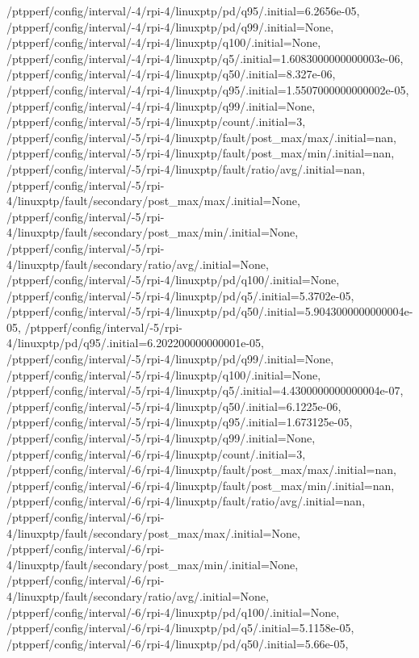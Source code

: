 {    /ptpperf/config/interval/-4/rpi-4/linuxptp/pd/q95/.initial=6.2656e-05,
    /ptpperf/config/interval/-4/rpi-4/linuxptp/pd/q99/.initial=None,
    /ptpperf/config/interval/-4/rpi-4/linuxptp/q100/.initial=None,
    /ptpperf/config/interval/-4/rpi-4/linuxptp/q5/.initial=1.6083000000000003e-06,
    /ptpperf/config/interval/-4/rpi-4/linuxptp/q50/.initial=8.327e-06,
    /ptpperf/config/interval/-4/rpi-4/linuxptp/q95/.initial=1.5507000000000002e-05,
    /ptpperf/config/interval/-4/rpi-4/linuxptp/q99/.initial=None,
    /ptpperf/config/interval/-5/rpi-4/linuxptp/count/.initial=3,
    /ptpperf/config/interval/-5/rpi-4/linuxptp/fault/post_max/max/.initial=nan,
    /ptpperf/config/interval/-5/rpi-4/linuxptp/fault/post_max/min/.initial=nan,
    /ptpperf/config/interval/-5/rpi-4/linuxptp/fault/ratio/avg/.initial=nan,
    /ptpperf/config/interval/-5/rpi-4/linuxptp/fault/secondary/post_max/max/.initial=None,
    /ptpperf/config/interval/-5/rpi-4/linuxptp/fault/secondary/post_max/min/.initial=None,
    /ptpperf/config/interval/-5/rpi-4/linuxptp/fault/secondary/ratio/avg/.initial=None,
    /ptpperf/config/interval/-5/rpi-4/linuxptp/pd/q100/.initial=None,
    /ptpperf/config/interval/-5/rpi-4/linuxptp/pd/q5/.initial=5.3702e-05,
    /ptpperf/config/interval/-5/rpi-4/linuxptp/pd/q50/.initial=5.9043000000000004e-05,
    /ptpperf/config/interval/-5/rpi-4/linuxptp/pd/q95/.initial=6.202200000000001e-05,
    /ptpperf/config/interval/-5/rpi-4/linuxptp/pd/q99/.initial=None,
    /ptpperf/config/interval/-5/rpi-4/linuxptp/q100/.initial=None,
    /ptpperf/config/interval/-5/rpi-4/linuxptp/q5/.initial=4.4300000000000004e-07,
    /ptpperf/config/interval/-5/rpi-4/linuxptp/q50/.initial=6.1225e-06,
    /ptpperf/config/interval/-5/rpi-4/linuxptp/q95/.initial=1.673125e-05,
    /ptpperf/config/interval/-5/rpi-4/linuxptp/q99/.initial=None,
    /ptpperf/config/interval/-6/rpi-4/linuxptp/count/.initial=3,
    /ptpperf/config/interval/-6/rpi-4/linuxptp/fault/post_max/max/.initial=nan,
    /ptpperf/config/interval/-6/rpi-4/linuxptp/fault/post_max/min/.initial=nan,
    /ptpperf/config/interval/-6/rpi-4/linuxptp/fault/ratio/avg/.initial=nan,
    /ptpperf/config/interval/-6/rpi-4/linuxptp/fault/secondary/post_max/max/.initial=None,
    /ptpperf/config/interval/-6/rpi-4/linuxptp/fault/secondary/post_max/min/.initial=None,
    /ptpperf/config/interval/-6/rpi-4/linuxptp/fault/secondary/ratio/avg/.initial=None,
    /ptpperf/config/interval/-6/rpi-4/linuxptp/pd/q100/.initial=None,
    /ptpperf/config/interval/-6/rpi-4/linuxptp/pd/q5/.initial=5.1158e-05,
    /ptpperf/config/interval/-6/rpi-4/linuxptp/pd/q50/.initial=5.66e-05,
}
